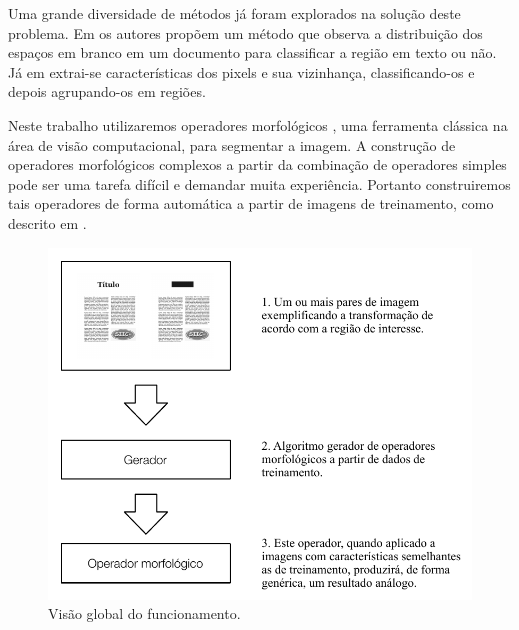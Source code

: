 \documentclass[a4paper,11pt]{article}
\begin{document}
Uma grande diversidade de métodos já foram explorados na solução deste problema. Em \cite{Antonacopoulos95representationand} os autores propõem um método que observa a distribuição dos espaços em branco em um documento para classificar a região em texto ou não. Já em \cite{Moll07documentcontent} extrai-se características dos pixels e sua vizinhança, classificando-os e depois agrupando-os em regiões.

Neste trabalho utilizaremos operadores morfológicos \cite{Serra:1983:IAM:1098652}, uma ferramenta clássica na área de visão computacional, para segmentar a imagem. A construção de operadores morfológicos complexos a partir da combinação de operadores simples pode ser uma tarefa difícil e demandar muita experiência. Portanto construiremos tais operadores de forma automática a partir de imagens de treinamento, como descrito em \cite{Tomita:1996:PrAuMa}.

\begin{figure}[htb!]
\begin{center}
\includegraphics{assets/methodology.pdf}
\end{center}
\caption{Visão global do funcionamento.}
\label{fig:schema_overview}
\end{figure}

\end{document}
